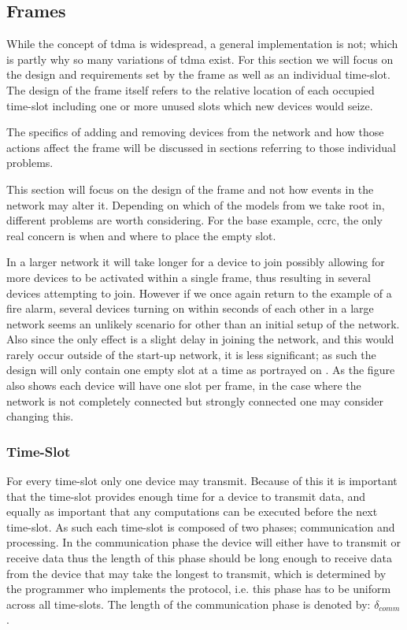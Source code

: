 \subsection{Frames}\label{GCRC:frame}
While the concept of \gls{tdma} is widespread, a general implementation is not; which is partly why so many variations of \gls{tdma} exist.
For this section we will focus on the design and requirements set by the frame as well as an individual time-slot.
The design of the frame itself refers to the relative location of each occupied time-slot including one or more unused slots which new devices would seize.

The specifics of adding and removing devices from the network and how those actions affect the frame will be discussed in sections referring to those individual problems.

This section will focus on the design of the frame and not how events in the network may alter it.
Depending on which of the models from  we take root in, different problems are worth considering.
For the base example, \gls{ccrc}, the only real concern is when and where to place the empty slot.

In a larger network it will take longer for a device to join possibly allowing for more devices to be activated within a single frame, thus resulting in several devices attempting to join.
However if we once again return to the example of a fire alarm, several devices turning on within seconds of each other in a large network seems an unlikely scenario for other than an initial setup of the network.
Also since the only effect is a slight delay in joining the network, and this would rarely occur outside of the start-up network, it is less significant; as such the design will only contain one empty slot at a time as portrayed on .
As the figure also shows each device will have one slot per frame, in the case where the network is not completely connected but strongly connected one may consider changing this.


\subsubsection*{Time-Slot}
For every time-slot only one device may transmit.
Because of this it is important that the time-slot provides enough time for a device to transmit data, and equally as important that any computations can be executed before the next time-slot.
As such each time-slot is composed of two phases; communication and processing.
In the communication phase the device will either have to transmit or receive data thus the length of this phase should be long enough to receive data from the device that may take the longest to transmit, which is determined by the programmer who implements the protocol, i.e. this phase has to be uniform across all time-slots.
The length of the communication phase is denoted by: $\delta_{comm}$.

